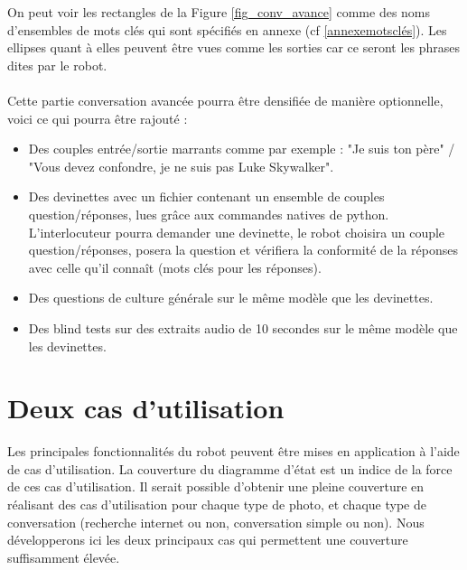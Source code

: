 On peut voir les rectangles de la Figure \ref{fig_conv_avance} comme des noms d'ensembles de mots clés qui sont spécifiés en annexe (cf \ref{annexemotsclés}). Les ellipses quant à elles peuvent être vues comme les sorties car ce seront les phrases dites par le robot. \\
\ \\
Cette partie conversation avancée pourra être densifiée de manière optionnelle, voici ce qui pourra être rajouté :
\begin{itemize}
    \item Des couples entrée/sortie marrants comme par exemple : "Je suis ton père" / "Vous devez confondre, je ne suis pas Luke Skywalker". 
    \item Des devinettes avec un fichier contenant un ensemble de couples question/réponses, lues grâce aux commandes natives de python. L'interlocuteur pourra demander une devinette, le robot choisira un couple question/réponses, posera la question et vérifiera la conformité de la réponses avec celle qu'il connaît (mots clés pour les réponses).
    \item Des questions de culture générale sur le même modèle que les devinettes.
    \item Des blind tests sur des extraits audio de 10 secondes sur le même modèle que les devinettes.
\end{itemize}

\section{Deux cas d'utilisation}
Les principales fonctionnalités du robot peuvent être mises en application à l'aide de cas d'utilisation. La couverture du diagramme d'état est un indice de la force de ces cas d'utilisation. Il serait possible d'obtenir une pleine couverture en réalisant des cas d'utilisation pour chaque type de photo, et chaque type de conversation (recherche internet ou non, conversation simple ou non). Nous développerons ici les deux principaux cas qui permettent une couverture suffisamment élevée.
